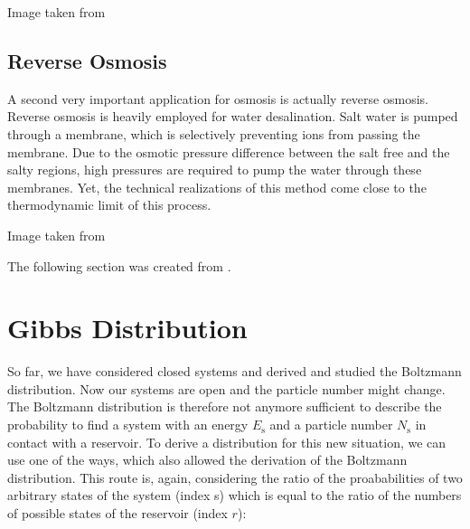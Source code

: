 \documentclass[letterpaper,10pt,english]{sphinxmanual}
\let\sphinxpxdimen\pdfpxdimen\else\newdimen\sphinxpxdimen
\begin{document}
\noindent\sphinxincludegraphics[width=1010\sphinxpxdimen,height=239\sphinxpxdimen]{{cells}.jpeg}

\sphinxAtStartPar
Image taken from 


\section{Reverse Osmosis}
\label{\detokenize{notebooks/L4/1_Osmotic_Pressure:Reverse-Osmosis}}
\sphinxAtStartPar
A second very important application for osmosis is actually reverse osmosis. Reverse osmosis is heavily employed for water desalination. Salt water is pumped through a membrane, which is selectively preventing ions from passing the membrane. Due to the osmotic pressure difference between the salt free and the salty regions, high pressures are required to pump the water through these membranes. Yet, the technical realizations of this method come close to the thermodynamic limit of this process.

\noindent\sphinxincludegraphics[width=801\sphinxpxdimen,height=339\sphinxpxdimen]{{reverse_osmosis}.jpeg}

\sphinxAtStartPar
Image taken from 



\sphinxAtStartPar
The following section was created from .


\chapter{Gibbs Distribution}
\label{\detokenize{notebooks/L4/2_Gibbs_Distribution:Gibbs-Distribution}}\label{\detokenize{notebooks/L4/2_Gibbs_Distribution::doc}}
\sphinxAtStartPar
So far, we have considered closed systems and derived and studied the Boltzmann distribution. Now our systems are open and the particle number might change. The Boltzmann distribution is therefore not anymore sufficient to describe the probability to find a system with an energy \(E_\mathrm{s}\) and a particle number \(N_\mathrm{s}\) in contact with a reservoir. To derive a distribution for this new situation, we can use one of the ways, which also allowed the derivation of the Boltzmann
distribution. This route is, again, considering the ratio of the proababilities of two arbitrary states of the system (index s) which is equal to the ratio of the numbers of possible states of the reservoir (index \(r\)):
\end{document}
